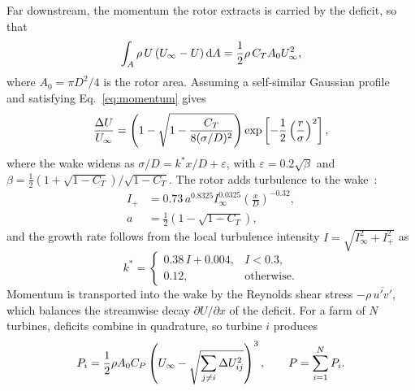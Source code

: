Far downstream, the momentum the rotor extracts is carried by the
deficit, so that
\begin{equation}
  \int_{A} \rho\, U \left( U_\infty - U \right) \mathrm{d}A
  = \frac{1}{2} \rho\, C_T A_0 U_\infty^2,
  \label{eq:momentum}
\end{equation}
where $A_0 = \pi D^2/4$ is the rotor area.
Assuming a self-similar Gaussian profile~\citep{bastankhah2014} and
satisfying Eq.~\eqref{eq:momentum} gives
\begin{equation}
  \frac{\Delta U}{U_\infty} = \left( 1 - \sqrt{1 - \frac{C_T}{8 (\sigma/D)^2}}
  \right) \exp\left[ -\frac{1}{2} \left( \frac{r}{\sigma} \right)^2
  \right],
  \label{eq:gaussian}
\end{equation}
where the wake widens as $\sigma/D = k^* x/D + \varepsilon$, with
$\varepsilon = 0.2\sqrt{\beta}$ and
$\beta = \frac{1}{2} \left( 1 + \sqrt{1 - C_T} \right) / \sqrt{1 - C_T}$.
The rotor adds turbulence to the wake~\citep{crespo1996}:
\begin{align}
  I_+ &= 0.73\, a^{0.8325} I_\infty^{0.0325}
    \left( \frac{x}{D} \right)^{-0.32}, \label{eq:added} \\
  a &= \frac{1}{2} \left( 1 - \sqrt{1 - C_T} \right),
\end{align}
and the growth rate follows from the local turbulence intensity
$I = \sqrt{I_\infty^2 + I_+^2}$ as
\begin{equation*}
  k^* = \begin{cases}
    0.38\, I + 0.004, & I < 0.3, \\
    0.12, & \text{otherwise}.
  \end{cases}
\end{equation*}
Momentum is transported into the wake by the Reynolds shear stress
$-\rho\,\overline{u'v'}$, which balances the streamwise decay
$\partial U / \partial x$ of the deficit.
For a farm of $N$ turbines, deficits combine in quadrature, so turbine
$i$ produces
\begin{equation}
  P_i = \frac{1}{2} \rho A_0 C_P \left( U_\infty
  - \sqrt{\sum_{j \neq i} \Delta U_{ij}^2} \right)^3,
  \qquad P = \sum_{i=1}^{N} P_i .
  \label{eq:farm}
\end{equation}
